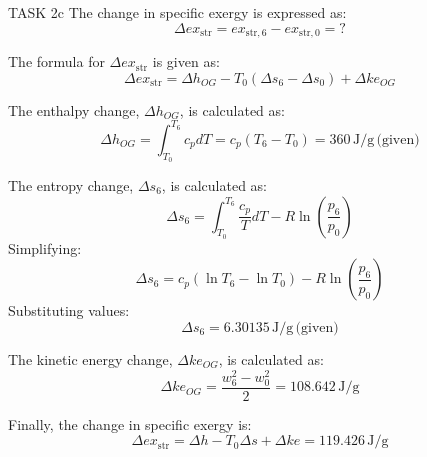 TASK 2c  
The change in specific exergy is expressed as:  
\[
\Delta ex_{\text{str}} = ex_{\text{str},6} - ex_{\text{str},0} = ?
\]  

The formula for \(\Delta ex_{\text{str}}\) is given as:  
\[
\Delta ex_{\text{str}} = \Delta h_{OG} - T_0 (\Delta s_{6} - \Delta s_{0}) + \Delta ke_{OG}
\]  

The enthalpy change, \(\Delta h_{OG}\), is calculated as:  
\[
\Delta h_{OG} = \int_{T_0}^{T_6} c_p dT = c_p (T_6 - T_0) = 360 \, \text{J/g} \, \text{(given)}
\]  

The entropy change, \(\Delta s_{6}\), is calculated as:  
\[
\Delta s_{6} = \int_{T_0}^{T_6} \frac{c_p}{T} dT - R \ln \left( \frac{p_6}{p_0} \right)
\]  
Simplifying:  
\[
\Delta s_{6} = c_p (\ln T_6 - \ln T_0) - R \ln \left( \frac{p_6}{p_0} \right)
\]  
Substituting values:  
\[
\Delta s_{6} = 6.30135 \, \text{J/g} \, \text{(given)}
\]  

The kinetic energy change, \(\Delta ke_{OG}\), is calculated as:  
\[
\Delta ke_{OG} = \frac{w_6^2 - w_0^2}{2} = 108.642 \, \text{J/g}
\]  

Finally, the change in specific exergy is:  
\[
\Delta ex_{\text{str}} = \Delta h - T_0 \Delta s + \Delta ke = 119.426 \, \text{J/g}
\]
